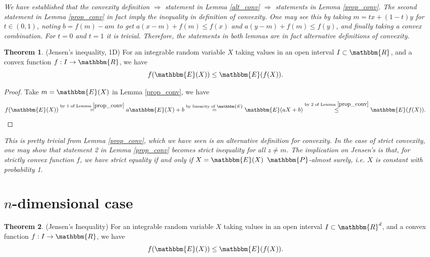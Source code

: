 \documentclass[10pt,a4paper]{article}
\theoremstyle{definition}
\newtheorem{theorem}{Theorem}
\def\P{\mathbbm{P}}
\def\E{\mathbbm{E}}
\def\R{\mathbbm{R}}
\begin{document}
\begin{remark}
\textit{We have established that the convexity definition $\Rightarrow$ statement in Lemma \ref{alt_conv} $\Rightarrow$ statements in Lemma \ref{prop_conv}. The second statement in Lemma \ref{prop_conv} in fact imply the inequality in definition of convexity. One may see this by taking $m=tx+(1-t)y$ for $t \in (0,1)$, noting $b=f(m)-am$ to get $a(x-m) + f(m) \leq f(x)$ and $a(y-m) + f(m) \leq f(y)$, and finally taking a convex combination. For $t=0$ and $t=1$ it is trivial. Therefore, the statements in both lemmas are in fact alternative definitions of convexity. }
\end{remark}

\begin{theorem} (Jensen's inequality, 1D) For an integrable random variable $X$ taking values in an open interval $I \subset \R$, and a convex function $f: I \rightarrow \R$, we have
$$f(\E(X)) \leq \E(f(X)).$$
\end{theorem}
\begin{proof}
Take $m=\E(X)$ in Lemma \ref{prop_conv}, we have
$$f(\E(X)) \stackrel{\text{by 1 of Lemma }\ref{prop_conv} }{=} a\E(X)+b \stackrel{\text{by linearity of }\E}{=} \E(aX+b) \stackrel{\text{by 2 of Lemma }\ref{prop_conv}}{\leq} \E(f(X)).$$
\end{proof}

\begin{remark}
\textit{This is pretty trivial from Lemma \ref{prop_conv}, which we have seen is an alternative definition for convexity. In the case of strict convexity, one may show that statement 2 in Lemma \ref{prop_conv} becomes strict inequality for all $z \neq m$. The implication on Jensen's is that, for strictly convex function $f$, we have strict equality if and only if $X = \E(X)$ $\P$-almost surely, i.e. $X$ is constant with probability 1.}
\end{remark}

\section{$n$-dimensional case}



\begin{theorem} (Jensen's Inequality) For an integrable random variable $X$ taking values in an open interval $I \subset \R^d$, and a convex function $f: I \rightarrow \R$, we have
$$f(\E(X)) \leq \E(f(X)).$$
\end{theorem} 
\end{document}
